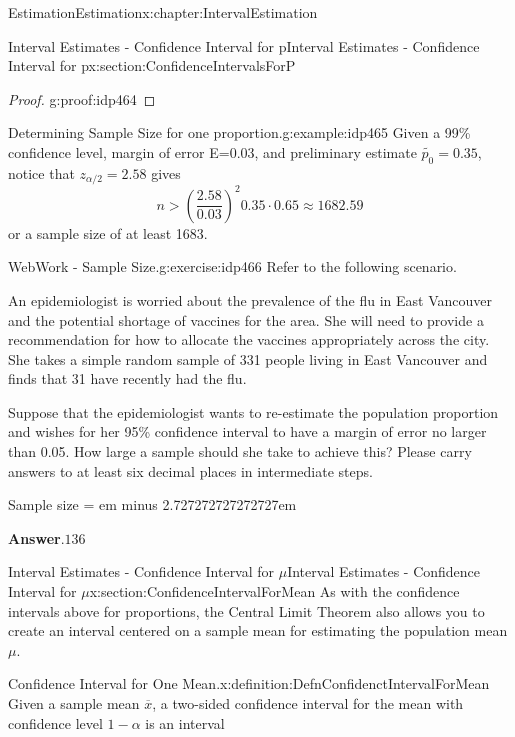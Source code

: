 \documentclass[oneside,10pt,]{book}
\newcommand{\blocktitlefont}{\relax}
\newcommand{\fillin}[1]{\leavevmode\leaders\vrule height -1.2pt depth 1.5pt \hskip #1em minus #1em \null}
\numberwithin{equation}{section}
\newcommand{\gt}{>}
\begin{document}
\begin{chapterptx}{Estimation}{}{Estimation}{}{}{x:chapter:IntervalEstimation}
\begin{sectionptx}{Interval Estimates - Confidence Interval for p}{}{Interval Estimates - Confidence Interval for p}{}{}{x:section:ConfidenceIntervalsForP}
\begin{proof}{}{g:proof:idp464}
\end{proof}
\begin{example}{Determining Sample Size for one proportion.}{g:example:idp465}%
Given a 99\% confidence level, margin of error E=0.03, and preliminary estimate \(\tilde{p_0} = 0.35\), notice that \(z_{\alpha / 2} = 2.58\) gives%
\begin{equation*}
n \gt \left ( \frac{2.58}{0.03} \right )^2 0.35 \cdot 0.65 \approx 1682.59
\end{equation*}
or a sample size of at least 1683.%
\end{example}
\begin{inlineexercise}{WebWork - Sample Size.}{g:exercise:idp466}%
Refer to the following scenario.%
\par
An epidemiologist is worried about the prevalence of the flu in East Vancouver and the potential shortage of vaccines for the area. She will need to provide a recommendation for how to allocate the vaccines appropriately across the city. She takes a simple random sample of 331 people living in East Vancouver and finds that 31 have recently had the flu.%
\par
Suppose that the epidemiologist wants to re-estimate the population proportion and wishes for her 95\% confidence interval to have a margin of error no larger than 0.05.  How large a sample should she take to achieve this? Please carry answers to at least six decimal places in intermediate steps.%
\par
Sample size = \fillin{2.727272727272727}%
\par\smallskip%
\noindent\textbf{\blocktitlefont Answer}.\hypertarget{g:answer:idp467}{}\quad{}\(136\)%
\end{inlineexercise}%
\end{sectionptx}
%
%
\typeout{************************************************}
\typeout{************************************************}
%
\begin{sectionptx}{Interval Estimates - Confidence Interval for \(\mu\)}{}{Interval Estimates - Confidence Interval for \(\mu\)}{}{}{x:section:ConfidenceIntervalForMean}
As with the confidence intervals above for proportions, the Central Limit Theorem also allows you to create an interval centered on a sample mean for estimating the population mean \(\mu\).%
\begin{definition}{Confidence Interval for One Mean.}{x:definition:DefnConfidenctIntervalForMean}%
Given a sample mean \(\overline{x}\), a two-sided confidence interval for the mean with confidence level \(1-\alpha\) is an interval%

\end{definition}
\end{sectionptx}
\end{chapterptx}
\end{document}
